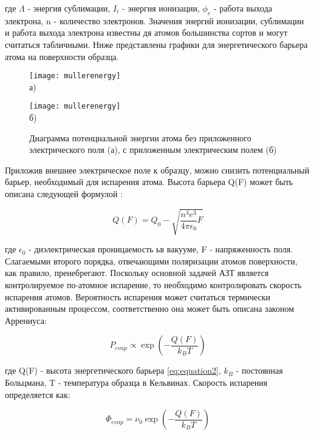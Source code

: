 где $\Lambda$ - энергия сублимации, $I_i$ - энергия ионизации, $\phi_e$ - работа выхода электрона, n - количество электронов. Значения энергий ионизации, сублимации и работа выхода электрона известны дя атомов большинства сортов и могут считаться табличными. Ниже представлены графики для энергетического барьера атома на поверхности образца.

\begin{figure}[ht]
	\begin{minipage}[b][][b]{0.49\textwidth}\centering
		\texttt{[image: mullerenergy]} \\ а)
	\end{minipage}
	\begin{minipage}[b][][b]{0.49\textwidth}\centering
		\texttt{[image: mullerenergy]} \\ б)
	\end{minipage}
	\caption{Диаграмма потенциальной энергии атома без приложенного электрического поля (а), с приложенным электрическим полем (б)}
	\label{fig:mulener}
\end{figure}

Приложив внешнее электрическое поле к образцу, можно снизить потенциальный барьер, необходимый для испарения атома. Высота барьера Q(F) может быть описана следующей формулой \cite{Muller56}:

\begin{equation}
	\label{eq:equation2}
	Q(F) = Q_0 - \sqrt{\frac{n^3 e^3}{4\pi\epsilon_0}F}
\end{equation}

где $\epsilon_0$ - диэлектрическая проницаемость ьв вакууме, F - напряженность поля. Слагаемыми второго порядка, отвечающими поляризации атомов поверхности, как правило, пренебрегают. Поскольку основной задачей АЗТ является контролируемое по-атомное испарение, то необходимо контролировать скорость испарения атомов. Вероятность испарения может считаться термически активированным процессом, соответственно она может быть описана законом Аррениуса:

\begin{equation}
	\label{eq:equation3}
	P_{evap} \propto \exp(-\frac{Q(F)}{k_B T})
\end{equation}

где Q(F) - высота энергетического барьера \cref{eq:equation2}, $k_B$ - постоянная Больцмана, T - температура образца в Кельвинах. Скорость испарения определяется как:

\begin{equation}
	\label{eq:equation4}
	\Phi_{evap} = \nu_0\exp(-\frac{Q(F)}{k_B T})
\end{equation}

